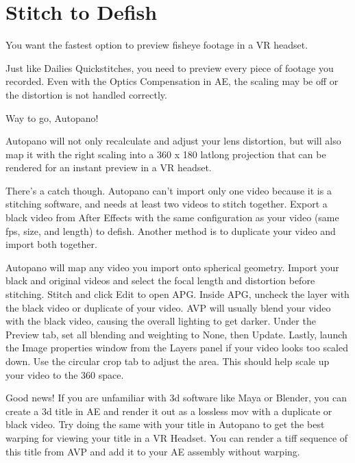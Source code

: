 \chapter{Stitch to Defish}
\pagecolor{white}
\label{chap:52}
\begin{fullwidth}

\problem

{\large You want the fastest option to preview fisheye footage in a VR headset. \par}

Just like Dailies Quickstitches, you need to preview every piece of footage you recorded. Even with the Optics Compensation in AE, the scaling may be off or the distortion is not handled correctly.

\solution

{\large Way to go, Autopano! \par}

Autopano will not only recalculate and adjust your lens distortion, but will also map it with the right scaling into a 360 x 180 latlong projection that can be rendered for an instant preview in a VR headset.

There’s a catch though. Autopano can’t import only one video because it is a stitching software, and needs at least two videos to stitch together. Export a black video from After Effects with the same configuration as your video (same fps, size, and length) to defish. Another method is to duplicate your video and import both together.

Autopano will map any video you import onto spherical geometry. Import your black and original videos and select the focal length and distortion before stitching. Stitch and click Edit to open APG. Inside APG, uncheck the layer with the black video or duplicate of your video. AVP will usually blend your video with the black video, causing the overall lighting to get darker. Under the Preview tab, set all blending and weighting to None, then Update. Lastly, launch the Image properties window from the Layers panel if your video looks too scaled down. Use the circular crop tab to adjust the area. This should help scale up your video to the 360 space.

Good news! If you are unfamiliar with 3d software like Maya or Blender, you can create a 3d title in AE and render it out as a lossless mov with a duplicate or black video. Try doing the same with your title in Autopano to get the best warping for viewing your title in a VR Headset. You can render a tiff sequence of this title from AVP and add it to your AE assembly without warping.


\clearpage
\end{fullwidth}